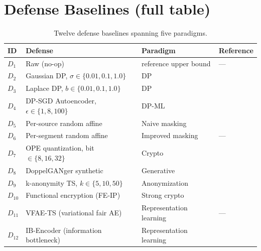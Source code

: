 \documentclass{article}
\theoremstyle{remark}
\begin{document}
\section{Defense Baselines (full table)}
\label{app:defenses}
\begin{table}[h]
\centering
\caption{Twelve defense baselines spanning five paradigms.}
\label{tab:defenses}
\small
\begin{tabular}{@{}llll@{}}
\toprule
ID & Defense & Paradigm & Reference \\
\midrule
$D_1$ & Raw (no-op) & reference upper bound & --- \\
$D_2$ & Gaussian DP, $\sigma \in \{0.01, 0.1, 1.0\}$ & DP & \cite{dwork2006} \\
$D_3$ & Laplace DP, $b \in \{0.01, 0.1, 1.0\}$ & DP & \cite{dwork2006} \\
$D_4$ & DP-SGD Autoencoder, $\epsilon \in \{1, 8, 100\}$ & DP-ML & \cite{abadi2016} \\
$D_5$ & Per-source random affine & Naive masking & \cite{binfet2024} \\
$D_6$ & Per-segment random affine & Improved masking & --- \\
$D_7$ & OPE quantization, bit $\in \{8, 16, 32\}$ & Crypto & \cite{boldyreva2009} \\
$D_8$ & DoppelGANger synthetic & Generative & \cite{doppelganger} \\
$D_9$ & k-anonymity TS, $k \in \{5, 10, 50\}$ & Anonymization & \cite{abul2008} \\
$D_{10}$ & Functional encryption (FE-IP) & Strong crypto & \cite{abdalla2015} \\
$D_{11}$ & VFAE-TS (variational fair AE) & Representation learning & --- \\
$D_{12}$ & IB-Encoder (information bottleneck) & Representation learning & \cite{tishby1999} \\
\bottomrule
\end{tabular}
\end{table}
\end{document}
